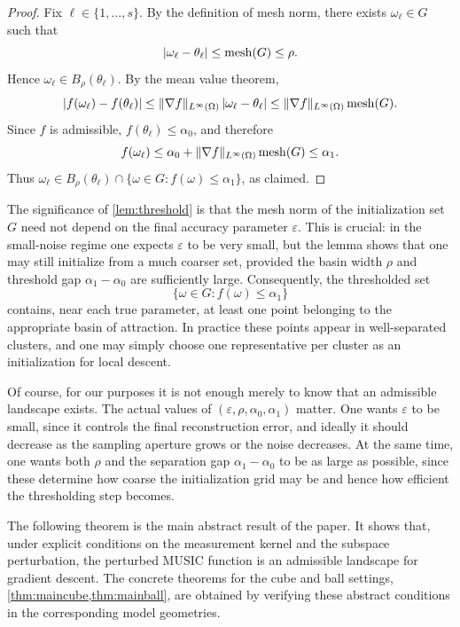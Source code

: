 \documentclass[11pt]{article}
\theoremstyle{definition}
\numberwithin{theorem}{section}
\numberwithin{lemma}{section}
\numberwithin{equation}{section}
\renewcommand{\epsilon}{\varepsilon}
\newcommand{\mesh}{{\rm mesh}}
\newcommand{\domain}{\Omega}
\numberwithin{equation}{section}
\begin{document}
\begin{proof}
Fix $\ell\in\{1,\dots,s\}$. By the definition of mesh norm, there exists $\omega_\ell\in G$ such that
\[
|\omega_\ell-\theta_\ell|\le \mesh(G)\le \rho.
\]
Hence $\omega_\ell\in B_\rho(\theta_\ell)$. By the mean value theorem,
\[
|f(\omega_\ell)-f(\theta_\ell)|
\le
\|\nabla f\|_{L^\infty(\domain)}\,|\omega_\ell-\theta_\ell|
\le
\|\nabla f\|_{L^\infty(\domain)}\,\mesh(G).
\]
Since $f$ is admissible, $f(\theta_\ell)\le \alpha_0$, and therefore
\[
f(\omega_\ell)
\le
\alpha_0+\|\nabla f\|_{L^\infty(\domain)}\,\mesh(G)
\le
\alpha_1.
\]
Thus $\omega_\ell\in B_\rho(\theta_\ell)\cap\{\omega\in G:f(\omega)\le \alpha_1\}$, as claimed.
\end{proof}

The significance of \cref{lem:threshold} is that the mesh norm of the initialization set $G$ need not depend on the final accuracy parameter $\epsilon$. This is crucial: in the small-noise regime one expects $\epsilon$ to be very small, but the lemma shows that one may still initialize from a much coarser set, provided the basin width $\rho$ and threshold gap $\alpha_1-\alpha_0$ are sufficiently large. Consequently, the thresholded set
\[
\{\omega\in G:f(\omega)\le \alpha_1\}
\]
contains, near each true parameter, at least one point belonging to the appropriate basin of attraction. In practice these points appear in well-separated clusters, and one may simply choose one representative per cluster as an initialization for local descent.

Of course, for our purposes it is not enough merely to know that an admissible landscape exists. The actual values of $(\epsilon,\rho,\alpha_0,\alpha_1)$ matter. One wants $\epsilon$ to be small, since it controls the final reconstruction error, and ideally it should decrease as the sampling aperture grows or the noise decreases. At the same time, one wants both $\rho$ and the separation gap $\alpha_1-\alpha_0$ to be as large as possible, since these determine how coarse the initialization grid may be and hence how efficient the thresholding step becomes.

The following theorem is the main abstract result of the paper. It shows that, under explicit conditions on the measurement kernel and the subspace perturbation, the perturbed MUSIC function is an admissible landscape for gradient descent. The concrete theorems for the cube and ball settings, \cref{thm:maincube,thm:mainball}, are obtained by verifying these abstract conditions in the corresponding model geometries.
\end{document}

